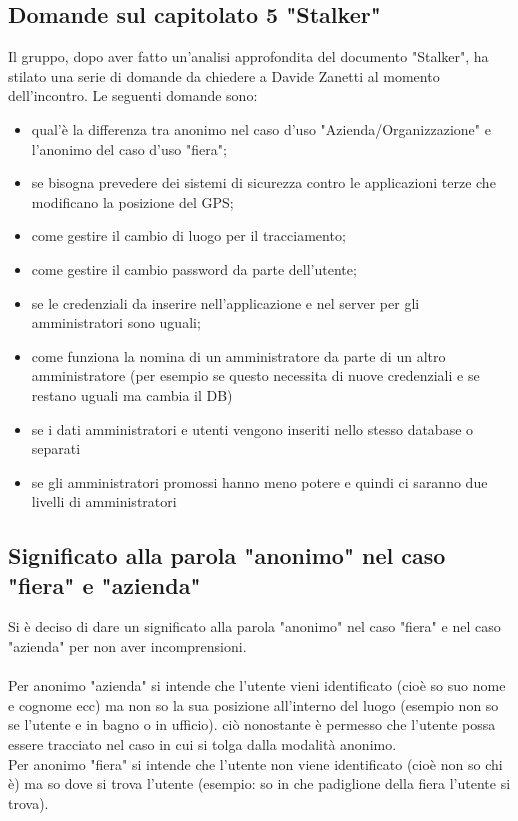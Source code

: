 \subsection{Domande sul capitolato 5 "Stalker"}
Il gruppo, dopo aver fatto un'analisi approfondita del documento "Stalker", ha stilato una serie di domande da chiedere a Davide Zanetti al momento dell'incontro.
Le seguenti domande sono:
\begin{itemize}
	\item qual'è la differenza tra anonimo nel caso d’uso "Azienda/Organizzazione" e l’anonimo del caso d’uso "fiera";
	\item se bisogna prevedere dei sistemi di sicurezza contro le applicazioni terze che modificano la posizione del GPS;
	\item come gestire il cambio di luogo per il tracciamento;
	\item come gestire il cambio password da parte dell’utente;
	\item se le credenziali da inserire nell’applicazione e nel server per gli amministratori sono uguali;
	\item come funziona la nomina di un amministratore da parte di un altro amministratore (per esempio se questo necessita di nuove credenziali e se restano uguali ma cambia il DB) 
	\item se i dati amministratori e utenti vengono inseriti nello stesso database o separati
	\item se gli amministratori promossi hanno meno potere e quindi ci saranno due livelli di amministratori
\end{itemize}

\subsection{Significato alla parola "anonimo" nel caso "fiera" e "azienda"}
Si è deciso di dare un significato alla parola "anonimo" nel caso "fiera" e nel caso "azienda" per non aver incomprensioni.
\\\\Per anonimo "azienda" si intende che l’utente vieni identificato (cioè so suo nome e cognome ecc) ma non so la sua posizione all’interno del luogo (esempio non so se l’utente e in bagno o in ufficio). ciò nonostante è permesso che l’utente possa essere tracciato nel caso in cui si tolga dalla modalità anonimo.
\\Per anonimo "fiera" si intende che l’utente non viene identificato (cioè non so chi è)
ma so dove si trova l’utente (esempio: so in che padiglione della fiera l’utente si trova).


\clearpage
